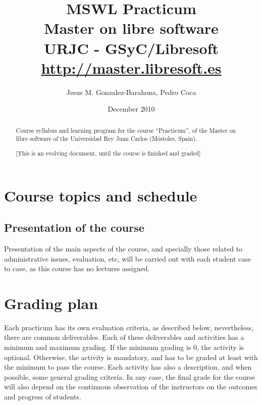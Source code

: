 \documentclass[a4paper]{article}
\title{MSWL Practicum\\
Master on libre software \\
URJC - GSyC/Libresoft \\
\url{http://master.libresoft.es}}
\author{Jesus M. Gonzalez-Barahona, Pedro Coca}
\date{December 2010}
\begin{document}
\maketitle

\begin{abstract}
Course syllabus and learning program for the course ``Practicum'', of the Master on libre software of the Universidad Rey Juan Carlos (Móstoles, Spain).

[This is an evolving document, until the course is finished and graded]
\end{abstract}

\tableofcontents

\section{Course topics and schedule}

\subsection{Presentation of the course}

Presentation of the main aspects of the course, and specially those related to administrative issues, evaluation, etc, will be carried out with each student case to case, as this course has no lectures assigned.


\section{Grading plan}

Each practicum has its own evaluation criteria, as described below, nevertheless, there are common deliverables. Each of these deliverables and activities has a minimum and maximum grading. If the minimum grading is 0, the activity is optional. Otherwise, the activity is mandatory, and has to be graded at least with the minimum to pass the course. Each activity has also a description, and when possible, some general grading criteria. In any case, the final grade for the course will also depend on the continuous observation of the instructors on the outcomes and progress of students.
\end{document}
